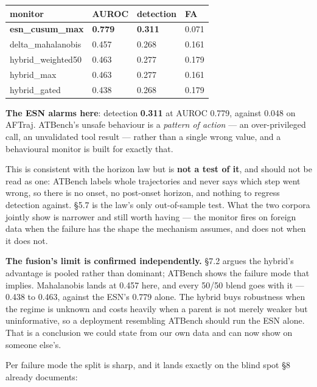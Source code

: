 \documentclass[11pt]{article}
\begin{document}
\begin{longtable}{llll}
\toprule
\textbf{monitor} & \textbf{AUROC} & \textbf{detection} & \textbf{FA} \\
\midrule
\endhead
\textbf{esn\_cusum\_max} & \textbf{0.779} & \textbf{0.311} & 0.071 \\
delta\_mahalanobis & 0.457 & 0.268 & 0.161 \\
hybrid\_weighted50 & 0.463 & 0.277 & 0.179 \\
hybrid\_max & 0.463 & 0.277 & 0.161 \\
hybrid\_gated & 0.438 & 0.268 & 0.179 \\
\bottomrule
\end{longtable}


\textbf{The ESN alarms here}: detection \textbf{0.311} at AUROC 0.779, against 0.048 on AFTraj. ATBench's unsafe behaviour is a \emph{pattern of action} --- an over-privileged call, an unvalidated tool result --- rather than a single wrong value, and a behavioural monitor is built for exactly that.


This is consistent with the horizon law but is \textbf{not a test of it}, and should not be read as one: ATBench labels whole trajectories and never says which step went wrong, so there is no onset, no post-onset horizon, and nothing to regress detection against. \S{}5.7 is the law's only out-of-sample test. What the two corpora jointly show is narrower and still worth having --- the monitor fires on foreign data when the failure has the shape the mechanism assumes, and does not when it does not.


\textbf{The fusion's limit is confirmed independently.} \S{}7.2 argues the hybrid's advantage is pooled rather than dominant; ATBench shows the failure mode that implies. Mahalanobis lands at 0.457 here, and every 50/50 blend goes with it --- 0.438 to 0.463, against the ESN's 0.779 alone. The hybrid buys robustness when the regime is unknown and costs heavily when a parent is not merely weaker but uninformative, so a deployment resembling ATBench should run the ESN alone. That is a conclusion we could state from our own data and can now show on someone else's.


Per failure mode the split is sharp, and it lands exactly on the blind spot \S{}8 already documents:
\end{document}
